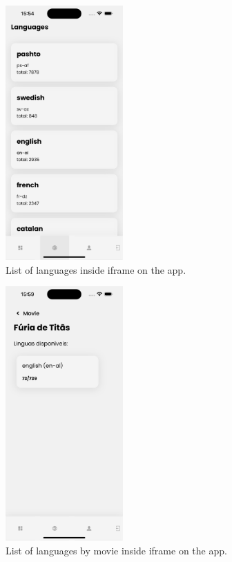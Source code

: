 \documentclass[12pt]{article}
\begin{document}
  \begin{figure}
    \centering
    \caption{
     List of languages inside iframe on the app.
    }
    \label{fig:app3}
    \includegraphics[width=0.4\textwidth]{assets/16.png}
  \end{figure}


  \begin{figure}
    \centering
    \caption{
     List of languages by movie inside iframe on the app.
    }
    \label{fig:app4}
    \includegraphics[width=0.4\textwidth]{assets/17.png}
  \end{figure}
\end{document}
